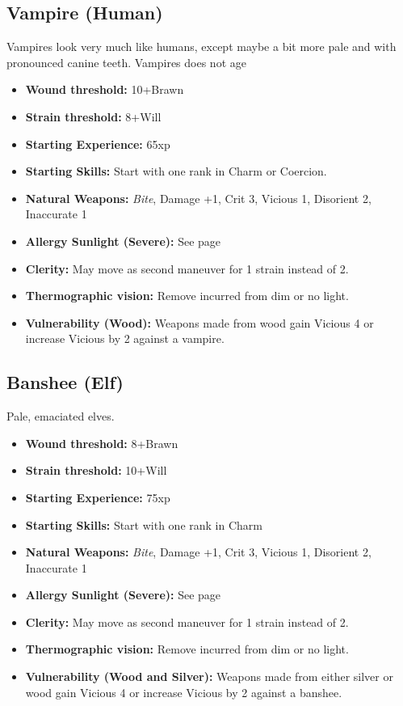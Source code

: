 \documentclass{book}
\begin{document}
\begin{multicols}{2}
	\subsection{Vampire (Human)}
	Vampires look very much like humans, except maybe a bit more pale and with pronounced canine teeth. Vampires does not age
	
	\begin{itemize}
		\item \textbf{Wound threshold:} 10+Brawn
		\item \textbf{Strain threshold:} 8+Will
		\item \textbf{Starting Experience:} 65xp
		\item \textbf{Starting Skills:} Start with one rank in Charm or Coercion.
		\item \textbf{Natural Weapons:} \textit{Bite}, Damage +1, Crit 3, Vicious 1, Disorient 2,  Inaccurate 1
		\item \textbf{Allergy Sunlight (Severe):} See page \pageref{allergysunlight} 
		\item \textbf{Clerity:} May move as second maneuver for 1 strain instead of 2.	
		\item \textbf{Thermographic vision:} Remove \SetbackDie \SetbackDie incurred from dim or no light.
		\item \textbf{Vulnerability (Wood):} Weapons made from wood gain Vicious 4 or increase Vicious by 2 against a vampire.
	
	\end{itemize}
	
	\subsection{Banshee (Elf)}
	Pale, emaciated elves.
	
	\begin{itemize}
		\item \textbf{Wound threshold:} 8+Brawn
		\item \textbf{Strain threshold:} 10+Will
		\item \textbf{Starting Experience:} 75xp
		\item \textbf{Starting Skills:} Start with one rank in Charm
		\item \textbf{Natural Weapons:} \textit{Bite}, Damage +1, Crit 3, Vicious 1, Disorient 2,  Inaccurate 1
		\item \textbf{Allergy Sunlight (Severe):} See page \pageref{allergysunlight} 
		\item \textbf{Clerity:} May move as second maneuver for 1 strain instead of 2.	
		\item \textbf{Thermographic vision:} Remove \SetbackDie \SetbackDie incurred from dim or no light.
		\item \textbf{Vulnerability (Wood and Silver):} Weapons made from either silver or wood gain Vicious 4 or increase Vicious by 2 against a banshee.
	\end{itemize}
	


\end{multicols}
\end{document}
